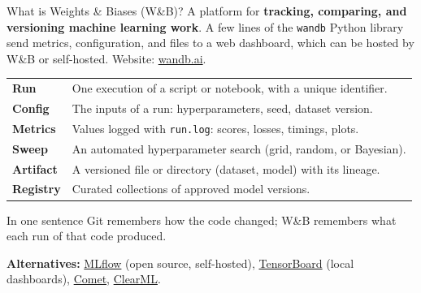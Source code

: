 \begin{frame}{What is Weights \& Biases (W\&B)?}
\begingroup\footnotesize
A platform for \textbf{tracking, comparing, and versioning machine learning work}. A few lines of the \texttt{wandb} Python library send metrics, configuration, and files to a web dashboard, which can be hosted by W\&B or self-hosted. Website: \href{https://wandb.ai}{wandb.ai}.
\vspace{0.5em}

\begin{tabularx}{\textwidth}{>{\bfseries}l X}
Run & One execution of a script or notebook, with a unique identifier. \\
\addlinespace[0.3em]
Config & The inputs of a run: hyperparameters, seed, dataset version. \\
\addlinespace[0.3em]
Metrics & Values logged with \texttt{run.log}: scores, losses, timings, plots. \\
\addlinespace[0.3em]
Sweep & An automated hyperparameter search (grid, random, or Bayesian). \\
\addlinespace[0.3em]
Artifact & A versioned file or directory (dataset, model) with its lineage. \\
\addlinespace[0.3em]
Registry & Curated collections of approved model versions. \\
\bottomrule
\end{tabularx}
\par\endgroup
\vspace{0.5em}
\begin{block}{In one sentence}
\footnotesize Git remembers how the code changed; W\&B remembers what each run of that code produced.
\end{block}
\vspace{0.3em}
{\scriptsize \textbf{Alternatives:} \href{https://mlflow.org}{MLflow} (open source, self-hosted), \href{https://www.tensorflow.org/tensorboard}{TensorBoard} (local dashboards), \href{https://www.comet.com}{Comet}, \href{https://clear.ml}{ClearML}.\par}
\coursefooter
\end{frame}

